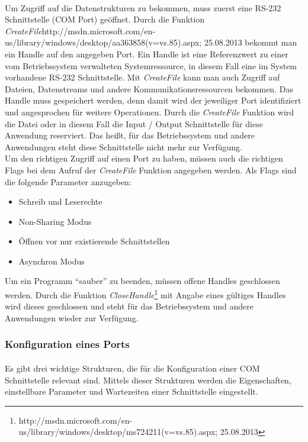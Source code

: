 \paragraph{}
Um Zugriff auf die Datenstrukturen zu bekommen, muss zuerst eine RS-232 Schnittstelle (COM Port) geöffnet. Durch die Funktion \textit{CreateFile}{http://msdn.microsoft.com/en-us/library/windows/desktop/aa363858(v=vs.85).aspx; 25.08.2013} bekommt man ein Handle auf den angegeben Port. Ein Handle ist eine Referenzwert zu einer vom Betriebssystem verwalteten Systemressource, in diesem Fall eine im System vorhandene RS-232 Schnittstelle. Mit \textit{CreateFile} kann man auch Zugriff auf Dateien, Datenstreams und andere Kommunikationsressourcen bekommen. Das Handle muss gespeichert werden, denn damit wird der jeweiliger Port identifiziert und angesprochen für weitere Operationen. Durch die \textit{CreateFile} Funktion wird die Datei oder in diesem Fall die Input / Output Schnittstelle für diese Anwendung reserviert. Das heißt, für das Betriebssystem und andere Anwendungen steht diese Schnittstelle nicht mehr zur Verfügung.
\\

Um den richtigen Zugriff auf einen Port zu haben, müssen auch die richtigen Flags bei dem Aufruf der \textit{CreateFile} Funktion angegeben werden. Als Flags sind die folgende Parameter anzugeben:
\begin{itemize}
\item Schreib und Leserechte
\item Non-Sharing Modus
\item Öffnen vor nur existierende Schnittstellen
\item Asynchron Modus
\end{itemize}

Um ein Programm "`sauber"' zu beenden, müssen offene Handles geschlossen werden. Durch die Funktion \textit{CloseHandle}\footnote{http://msdn.microsoft.com/en-us/library/windows/desktop/ms724211(v=vs.85).aspx; 25.08.2013} mit Angabe eines gültiges Handles wird dieses geschlossen und steht für das Betriebssystem und andere Anwendungen wieder zur Verfügung.


\subsubsection{Konfiguration eines Ports}
\paragraph{}
Es gibt drei wichtige Strukturen, die für die Konfiguration einer COM Schnittstelle relevant sind. Mittels dieser Strukturen werden die Eigenschaften, einstellbare Parameter und Wartezeiten einer Schnittstelle eingestellt.
\\

